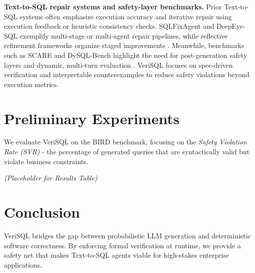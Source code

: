 \documentclass[sigconf,review,anonymous]{acmart}
\begin{document}
\textbf{Text-to-SQL repair systems and safety-layer benchmarks.} Prior Text-to-SQL systems often emphasize execution accuracy and iterative repair using execution feedback or heuristic consistency checks. SQLFixAgent and DeepEye-SQL exemplify multi-stage or multi-agent repair pipelines, while reflective refinement frameworks organize staged improvements \cite{sqlfixagent2024,deepeyesql2025,reflectivesql2026}. Meanwhile, benchmarks such as SCARE and DySQL-Bench highlight the need for post-generation safety layers and dynamic, multi-turn evaluation \cite{scare2025,dysqlbench2025}. VeriSQL focuses on spec-driven verification and interpretable counterexamples to reduce safety violations beyond execution metrics.

\section{Preliminary Experiments}

We evaluate VeriSQL on the BIRD benchmark, focusing on the \textit{Safety Violation Rate (SVR)} - the percentage of generated queries that are syntactically valid but violate business constraints.

\textit{(Placeholder for Results Table)}

\section{Conclusion}
VeriSQL bridges the gap between probabilistic LLM generation and deterministic software correctness. By enforcing formal verification at runtime, we provide a safety net that makes Text-to-SQL agents viable for high-stakes enterprise applications.



\end{document}
